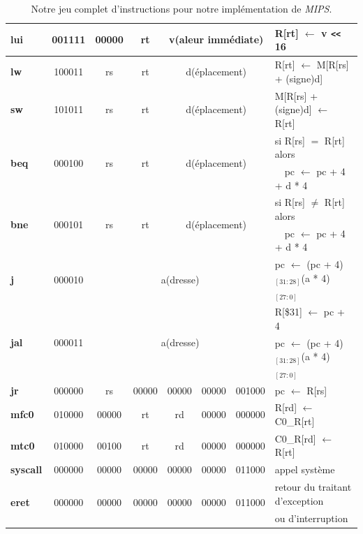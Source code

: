 \documentclass[12pt]{article}
\begin{document}
\begin{table}[!htpb]
\begin{center}
\begin{tabular}{|l|c|c|c|c|c|c|l|}
  \hline
  \textbf{lui} & 001111 & 00000 & rt & \multicolumn{3}{|c|}{v(aleur immédiate)} & R[rt] $\leftarrow$ v \verb+<<+ 16\\
  \hline
  \textbf{lw} & 100011 & rs & rt & \multicolumn{3}{|c|}{d(éplacement)} & R[rt] $\leftarrow$ M[R[rs] + (signe)d]\\
  \hline
  \textbf{sw} & 101011 & rs & rt & \multicolumn{3}{|c|}{d(éplacement)} & M[R[rs] + (signe)d] $\leftarrow$ R[rt]\\
  \hline
  \multirow{2}{*}{\textbf{beq}} & \multirow{2}{*}{000100} & \multirow{2}{*}{rs} & \multirow{2}{*}{rt} & \multicolumn{3}{|c|}{\multirow{2}{*}{d(éplacement)}} & si R[rs] $=$ R[rt] alors\\
      &        &    &    & \multicolumn{3}{|c|}{} & \ \ pc $\leftarrow$ pc + 4 + d * 4\\
  \hline
  \multirow{2}{*}{\textbf{bne}} & \multirow{2}{*}{000101} & \multirow{2}{*}{rs} & \multirow{2}{*}{rt} & \multicolumn{3}{|c|}{\multirow{2}{*}{d(éplacement)}} & si R[rs] $\ne$ R[rt] alors\\
      &        &    &    & \multicolumn{3}{|c|}{} & \ \ pc $\leftarrow$ pc + 4 + d * 4\\
  \hline
  \textbf{j} & 000010 & \multicolumn{5}{|c|}{a(dresse)} & pc $\leftarrow$ (pc + 4)$_{[31:28]}$(a * 4)$_{[27:0]}$\\
  \hline
  \multirow{2}{*}{\textbf{jal}} & \multirow{2}{*}{000011} & \multicolumn{5}{|c|}{\multirow{2}{*}{a(dresse)}} & R[\$31] $\leftarrow$ pc + 4\\
                       &                         & \multicolumn{5}{|c|}{}                           & pc $\leftarrow$ (pc + 4)$_{[31:28]}$(a * 4)$_{[27:0]}$\\
  \hline
  \textbf{jr} & 000000 & rs & 00000 & 00000 & 00000 & 001000 & pc $\leftarrow$ R[rs]\\
  \hline
  \textbf{mfc0} & 010000 & 00000 & rt & rd & 00000 & 000000 & R[rd] $\leftarrow$ C0\_R[rt]\\
  \hline
  \textbf{mtc0} & 010000 & 00100 & rt & rd & 00000 & 000000 & C0\_R[rd] $\leftarrow$ R[rt]\\
  \hline
  \textbf{syscall} & 000000 & 00000 & 00000 & 00000 & 00000 & 011000 & appel système\\
  \hline
  \multirow{2}{*}{\textbf{eret}} & \multirow{2}{*}{000000} & \multirow{2}{*}{00000} &
  \multirow{2}{*}{00000} & \multirow{2}{*}{00000} & \multirow{2}{*}{00000} & \multirow{2}{*}{011000} & retour du traitant d'exception\\
  & & & & & & & ou d'interruption\\
  \hline
\end{tabular}
\end{center}
\caption{Notre jeu complet d'instructions pour notre implémentation de \emph{MIPS}.}
\label{table:instructions}
\end{table}
\end{document}
